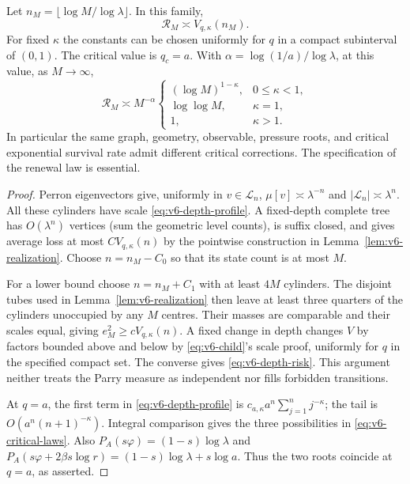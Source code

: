 \begin{theorem}\label{thm:v6-critical}
Let $n_M=\lfloor\log M/\log\lambda\rfloor$. In this family,
\begin{equation}
                    \mathcal R_M\asymp V_{q,\kappa}(n_M).
                                                        \label{eq:v6-depth-risk}
\end{equation}
For fixed $\kappa$ the constants can be chosen uniformly for $q$ in
a compact subinterval of $(0,1)$. The critical value is $q_c=a$.
With $\alpha=\log(1/a)/\log\lambda$, at this value, as $M\to\infty$,
\begin{equation}
 \mathcal R_M\asymp M^{-\alpha}
 \begin{cases}
  (\log M)^{1-\kappa},&0\le\kappa<1,\\
  \log\log M,&\kappa=1,\\
  1,&\kappa>1.
 \end{cases}                                             \label{eq:v6-critical-laws}
\end{equation}
In particular the same graph, geometry, observable, pressure roots,
and critical exponential survival rate admit different critical
corrections. The specification of the renewal law is essential.
\end{theorem}
\begin{proof}
Perron eigenvectors give, uniformly in $v\in\mathcal L_n$,
$\mu[v]\asymp\lambda^{-n}$ and $|\mathcal L_n|\asymp\lambda^n$.
All these cylinders have scale \eqref{eq:v6-depth-profile}.
A fixed-depth complete tree has $O(\lambda^n)$ vertices (sum the
geometric level counts), is suffix closed, and gives average loss
at most $CV_{q,\kappa}(n)$ by the pointwise construction in
Lemma~\ref{lem:v6-realization}. Choose $n=n_M-C_0$ so that its state
count is at most $M$.

For a lower bound choose $n=n_M+C_1$ with at least $4M$ cylinders.
The disjoint tubes used in Lemma~\ref{lem:v6-realization} then leave
at least three quarters of the cylinders unoccupied by any $M$
centres. Their masses are comparable and their scales equal, giving
$e_M^2\ge cV_{q,\kappa}(n)$. A fixed change in depth changes $V$
by factors bounded above and below by \eqref{eq:v6-child}'s scale
proof, uniformly for $q$ in the specified compact set. The converse
gives \eqref{eq:v6-depth-risk}. This argument neither treats the
Parry measure as independent nor fills forbidden transitions.

At $q=a$, the first term in \eqref{eq:v6-depth-profile} is
$c_{a,\kappa}a^n\sum_{j=1}^n j^{-\kappa}$; the tail is
$O(a^n(n+1)^{-\kappa})$. Integral comparison gives the three
possibilities in \eqref{eq:v6-critical-laws}. Also
$P_A(s\varphi)= (1-s)\log\lambda$ and
$P_A(s\varphi+2\beta s\log r)=(1-s)\log\lambda+s\log a$.
Thus the two roots coincide at $q=a$, as asserted.
\end{proof}

